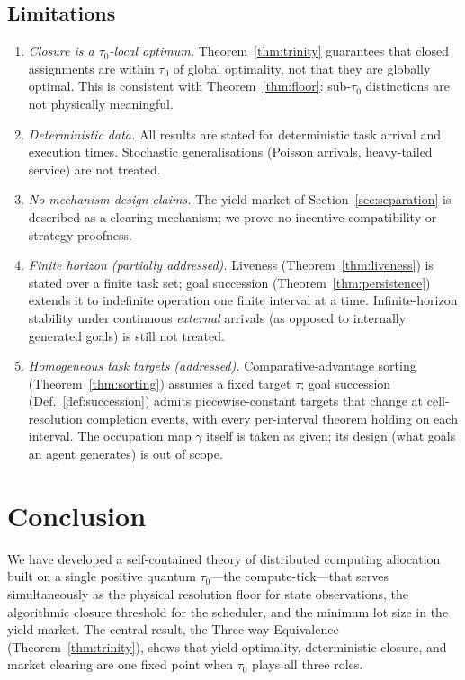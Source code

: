 \documentclass[11pt,twocolumn,a4paper]{article}
\theoremstyle{plain}
\theoremstyle{definition}
\theoremstyle{remark}
\newcommand{\tick}{\tau_0}
\begin{document}
\subsection{Limitations}

\begin{enumerate}[nosep]
\item \emph{Closure is a $\tick$-local optimum.} Theorem~\ref{thm:trinity} guarantees that closed assignments are within $\tick$ of global optimality, not that they are globally optimal. This is consistent with Theorem~\ref{thm:floor}: sub-$\tick$ distinctions are not physically meaningful.
\item \emph{Deterministic data.} All results are stated for deterministic task arrival and execution times. Stochastic generalisations (Poisson arrivals, heavy-tailed service) are not treated.
\item \emph{No mechanism-design claims.} The yield market of Section~\ref{sec:separation} is described as a clearing mechanism; we prove no incentive-compatibility or strategy-proofness.
\item \emph{Finite horizon (partially addressed).} Liveness (Theorem~\ref{thm:liveness}) is stated over a finite task set; goal succession (Theorem~\ref{thm:persistence}) extends it to indefinite operation one finite interval at a time. Infinite-horizon stability under continuous \emph{external} arrivals (as opposed to internally generated goals) is still not treated.
\item \emph{Homogeneous task targets (addressed).} Comparative-advantage sorting (Theorem~\ref{thm:sorting}) assumes a fixed target $\tau$; goal succession (Def.~\ref{def:succession}) admits piecewise-constant targets that change at cell-resolution completion events, with every per-interval theorem holding on each interval. The occupation map $\gamma$ itself is taken as given; its design (what goals an agent generates) is out of scope.
\end{enumerate}

\section{Conclusion}
\label{sec:conclusion}

We have developed a self-contained theory of distributed computing allocation built on a single positive quantum $\tick$---the compute-tick---that serves simultaneously as the physical resolution floor for state observations, the algorithmic closure threshold for the scheduler, and the minimum lot size in the yield market. The central result, the Three-way Equivalence (Theorem~\ref{thm:trinity}), shows that yield-optimality, deterministic closure, and market clearing are one fixed point when $\tick$ plays all three roles.
\end{document}
